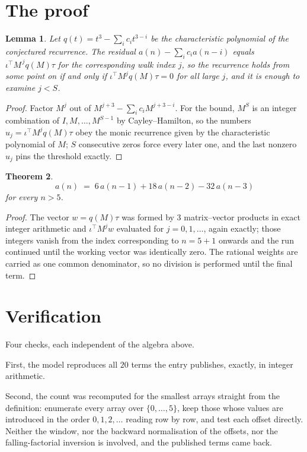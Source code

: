 \documentclass[11pt,a4paper]{article}
\theoremstyle{plain}
\newtheorem{theorem}{Theorem}
\newtheorem{lemma}[theorem]{Lemma}
\theoremstyle{definition}
\begin{document}
\section{The proof}

\begin{lemma}\label{lem:crit}
Let $q(t)=t^{3}-\sum_i c_it^{3-i}$ be the characteristic polynomial of the
conjectured recurrence. The residual $a(n)-\sum_ic_ia(n-i)$ equals
$\iota^{\!\top}M^{\,j}q(M)\tau$ for the corresponding walk index $j$, so the recurrence
holds from some point on if and only if $\iota^{\!\top}M^{j}q(M)\tau=0$ for all large $j$,
and it is enough to examine $j<S$.
\end{lemma}

\begin{proof}
Factor $M^{j}$ out of $M^{j+3}-\sum_ic_iM^{j+3-i}$. For the bound, $M^{S}$
is an integer combination of $I,M,\dots,M^{S-1}$ by Cayley--Hamilton, so the numbers
$u_j=\iota^{\!\top}M^{j}q(M)\tau$ obey the monic recurrence given by the characteristic
polynomial of $M$; $S$ consecutive zeros force every later one, and the last nonzero $u_j$
pins the threshold exactly.
\end{proof}

\begin{theorem}
\[
a(n)\;=\;6\,a(n-1) + 18\,a(n-2) - 32\,a(n-3)
\]
for every $n>5$.
\end{theorem}

\begin{proof}
The vector $w=q(M)\tau$ was formed by $3$ matrix--vector products in exact integer
arithmetic and $\iota^{\!\top}M^{j}w$ evaluated for $j=0,1,\dots$, again exactly; those
integers vanish from the index corresponding to $n=5+1$ onwards and the run continued
until the working vector was identically zero. The rational weights are carried as one common
denominator, so no division is performed until the final term.
\end{proof}

\section{Verification}

Four checks, each independent of the algebra above.

First, the model reproduces all $20$ terms the entry publishes, exactly, in integer
arithmetic.

Second, the count was recomputed for the smallest arrays straight from the definition:
enumerate every array over $\{0,\dots,5\}$, keep those whose values are introduced in the
order $0,1,2,\dots$ reading row by row, and test each offset directly. Neither the window, nor
the backward normalisation of the offsets, nor the falling-factorial inversion is involved, and
the published terms came back.
\end{document}
